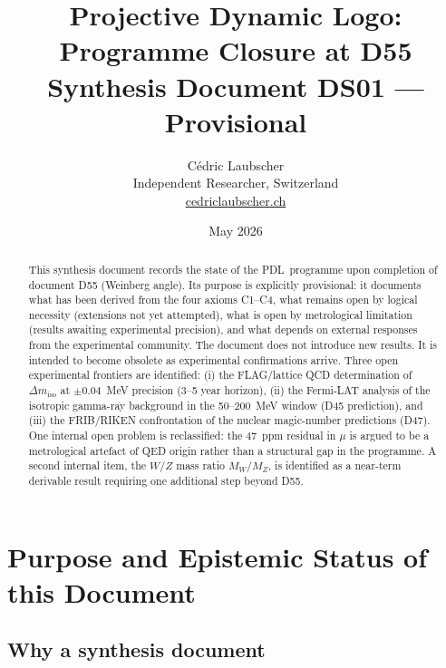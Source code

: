 \documentclass[12pt,a4paper]{article}
\theoremstyle{definition}
\newcommand{\PDL}{\textsc{PDL}}
\newcommand{\Dmiso}{\Delta m_{\mathrm{iso}}}
\begin{document}

\title{\textbf{Projective Dynamic Logo: Programme Closure at D55}\\[0.5em]
\large Synthesis Document DS01 --- Provisional}
\author{Cédric Laubscher\\
\small Independent Researcher, Switzerland\\
\small \href{https://cedriclaubscher.ch}{cedriclaubscher.ch}}
\date{May 2026}
\maketitle

\begin{abstract}
This synthesis document records the state of the \PDL\ programme upon completion of document D55 (Weinberg angle). Its purpose is explicitly provisional: it documents what has been derived from the four axioms C1--C4, what remains open by logical necessity (extensions not yet attempted), what is open by metrological limitation (results awaiting experimental precision), and what depends on external responses from the experimental community. The document does not introduce new results. It is intended to become obsolete as experimental confirmations arrive. Three open experimental frontiers are identified: (i) the FLAG/lattice QCD determination of $\Dmiso$ at $\pm 0.04$~MeV precision (3--5 year horizon), (ii) the Fermi-LAT analysis of the isotropic gamma-ray background in the 50--200~MeV window (D45 prediction), and (iii) the FRIB/RIKEN confrontation of the nuclear magic-number predictions (D47). One internal open problem is reclassified: the 47~ppm residual in $\mu$ is argued to be a metrological artefact of QED origin rather than a structural gap in the programme. A second internal item, the $W/Z$ mass ratio $M_W/M_Z$, is identified as a near-term derivable result requiring one additional step beyond D55.
\end{abstract}
\clearpage

\tableofcontents
\newpage

\section{Purpose and Epistemic Status of this Document}
\label{sec:purpose}

\subsection{Why a synthesis document}
\end{document}
